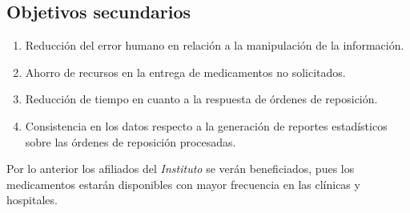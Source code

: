 \subsection{Objetivos secundarios}\label{sec:objetivos-secundarios}
\begin{enumerate}
\item Reducción del error humano en relación a la manipulación de la información.
\item Ahorro de recursos en la entrega de medicamentos no solicitados.
\item Reducción de tiempo en cuanto a la respuesta de órdenes de reposición.
\item Consistencia en los datos respecto a la generación de reportes estadísticos sobre las órdenes de reposición procesadas.
\end{enumerate}
Por lo anterior los afiliados del \textit{Instituto} se verán beneficiados, pues los medicamentos estarán disponibles con mayor frecuencia en las clínicas y hospitales.

